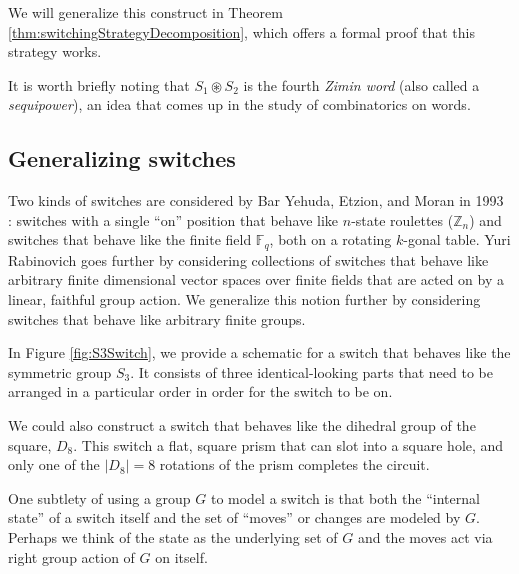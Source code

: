 We will generalize this construct in
Theorem \ref{thm:switchingStrategyDecomposition},
which offers a formal proof that this strategy works.

It is worth briefly noting that $S_1 \circledast S_2$ is the fourth
\textit{Zimin word} (also called a \textit{sequipower}),
an idea that comes up in the study of combinatorics on words.

\subsection{Generalizing switches}
\label{sec:GeneralizingSwitches}
Two kinds of switches are considered by Bar Yehuda, Etzion, and Moran in 1993
\cite{BarYehuda1993}: switches with a single ``on'' position that behave like
$n$-state roulettes ($\mathbb Z_n$) and switches that behave like
the finite field $\mathbb F_q$, both on a rotating $k$-gonal table.
Yuri Rabinovich \cite{Rabinovich2022} goes further by considering collections
of switches that behave like arbitrary finite dimensional vector spaces over
finite fields that are acted on by a linear, faithful group action.
We generalize this notion further by considering switches that behave like
arbitrary finite groups.

\begin{example}
In Figure \ref{fig:S3Switch}, we provide a schematic for a switch that behaves
like the symmetric group $S_3$.
It consists of three identical-looking parts that need to be
arranged in a particular order in order for the switch to be on.

We could also construct a switch that behaves like the dihedral group of the
square, $D_8$. This switch a flat, square prism that can slot into a square hole,
and only one of the $|D_8| = 8$ rotations of the prism completes the circuit.
\label{ex:S3D8Schematics}
\end{example}



One subtlety of using a group $G$ to model a switch is that
both the ``internal state'' of a switch itself and
the set of ``moves'' or changes are modeled by $G$.
Perhaps we think of the state as the underlying set of $G$
and the moves act via right group action of $G$ on itself.

